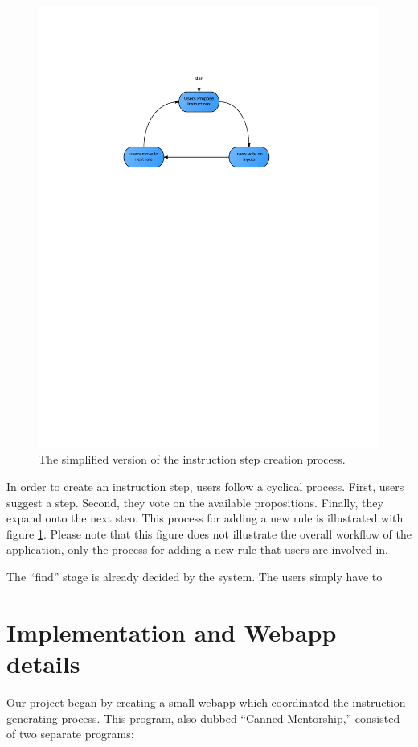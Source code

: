 \begin{figure}
	\begin{center}
	\includegraphics{figures/cmWorkflow1.png}
	\caption{The simplified version of the instruction step creation process.}
	\label{fig:cmWorkflow1}
	\end{center}
\end{figure}

In order to create an instruction step, users follow a cyclical process.
First, users suggest a step. 
Second, they vote on the available propositions.
Finally, they expand onto the next steo.
 This process for adding a new rule is illustrated with figure \ref{fig:cmWorkflow1}. 
Please note that this figure does not illustrate the overall workflow of the application, only the process for adding a new rule that users are involved in.

The ``find'' stage is already decided by the system. The users simply have to

\section{Implementation and Webapp details}
Our project began by creating a small webapp which coordinated the instruction generating process.
This program, also dubbed ``Canned Mentorship,'' consisted of two separate programs:

